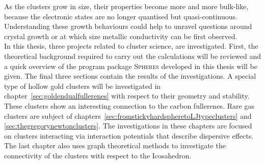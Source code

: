 As the clusters grow in size, their properties become more and more bulk-like,
because the electronic states are no longer quantised but quasi-continuous.
Understanding these growth behaviours could help to unravel questions around
crystal growth or at which size metallic conductivity can be first observed. 
\\\newline
In this thesis, three projects related to cluster science, are investigated.
First, the theoretical background required to carry out the calculations will be
reviewed and a quick overview of the program package \textsc{Spheres} developed
in this thesis will be given. The final three sections contain the results of
the investigations. A special type of hollow gold clusters will be investigated
in chapter~\ref{sec:goldendualfullerenes} with respect to their geometry and
stability. These clusters show an interesting connection to the carbon
fullerenes. Rare gas clusters are subject of
chapters~\ref{sec:fromstickyhardspheretoLJtypeclusters} and
\ref{sec:thegregorynewtonclusters}. The investigations in these chapters are
focused on clusters interacting via interaction potentials that describe
dispersive effects. The last chapter also uses graph theoretical methods to
investigate the connectivity of the clusters with respect to the Icosahedron.

